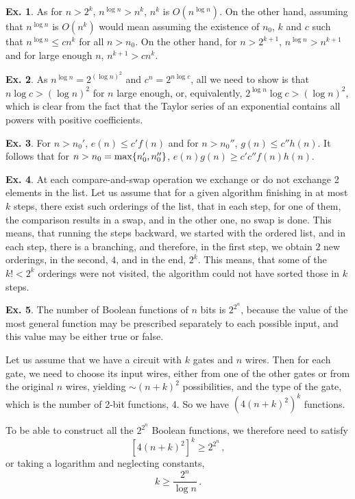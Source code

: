 \documentclass[a4paper,12pt]{article}
\theoremstyle{definition}
\newtheorem{exercise}{Ex.}[section]
\begin{document}
\begin{exercise}
 As for $n>2^k$, $n^{\log n} > n^k$, $n^k$ is $O(n^{\log n})$. On the other hand, assuming that $n^{\log n}$ is $O(n^k)$ would mean assuming the existence of $n_0$, $k$ and $c$ such that $n^{\log n} \le c n^k$ for all $n>n_0$. On the other hand, for $n> 2^{k+1}$, $n^{\log n} > n^{k+1}$ and for large enough $n$, $n^{k+1} > c n^k$.
\end{exercise}

\begin{exercise}
 As $n^{\log n} = 2^{(\log n)^2}$ and $c^n = 2^{n\log c}$, all we need to show is that $n\log c > (\log n)^2$ for $n$ large enough, or, equivalently, $2^{\log n} \log c > (\log n)^2$, which is clear from the fact that the Taylor series of an exponential contains all powers with positive coefficients.
\end{exercise}

\begin{exercise}
 For $n > n_0'$, $e(n) \le c' f(n)$ and for $n> n_0''$, $g(n) \le c'' h(n)$. It follows that for $n > n_0 = {\rm max}\{n_0', n_0''\}$, $e(n) g(n) \ge c' c'' f(n) h(n)$.
\end{exercise}

\begin{exercise}
 At each compare-and-swap operation we exchange or do not exchange 2 elements in the list. Let us assume that for a given algorithm finishing in at most $k$ steps, there exist such orderings of the list, that in each step, for one of them, the comparison results in a swap, and in the other one, no swap is done. This means, that running the steps backward, we started with the ordered list, and in each step, there is a branching, and therefore, in the first step, we obtain $2$ new orderings, in the second, $4$, and in the end, $2^k$. This means, that some of the $k! < 2^k$ orderings were not visited, the algorithm could not have sorted those in $k$ steps.
\end{exercise}

\begin{exercise}
 The number of Boolean functions of $n$ bits is $2^{2^n}$, because the value of the most general function may be prescribed separately to each possible input, and this value may be either true or false.
 
 Let us assume that we have a circuit with $k$ gates and $n$ wires. Then for each gate, we need to choose its input wires, either from one of the other gates or from the original $n$ wires, yielding $\sim (n+k)^2$ possibilities, and the type of the gate, which is the number of 2-bit functions, 4. So we have $(4 (n+k)^2)^k$ functions.
 
 To be able to construct all the $2^{2^n}$ Boolean functions, we therefore need to satisfy
 \[
  [4(n+k)^2]^k \ge 2^{2^n}\,,
 \]
 or taking a logarithm and neglecting constants,
 \[
  k \ge \frac{2^n}{\log n}\,.
 \]
\end{exercise}
\end{document}
